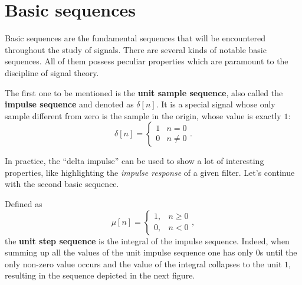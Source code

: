 \documentclass[\documentfontsize, twocolumn]{\classname}
\begin{document}
\section{Basic se\-quen\-ces}
Basic se\-quen\-ces are the fundamental se\-quen\-ces that will be encountered throughout the study of signals.
There are several kinds of notable basic se\-quen\-ces. All of them possess peculiar properties which are paramount to the discipline of signal theory.

The first one to be mentioned is the \textbf{unit sample se\-quen\-ce}, also called the \textbf{impulse se\-quen\-ce} and denoted as $\delta[n]$. It is a special signal whose only sample different from zero is the sample in the origin, whose value is exactly $1$: \[\delta[n] = \left\{\begin{array}{ll} 1 & n = 0\\ 0 & n \neq 0 \end{array}\right..\]

\begin{center}
\end{center}

In practice, the ``delta impulse'' can be used to show a lot of interesting properties, like highlighting the \emph{impulse response} of a given filter. 
Let's continue with the second basic se\-quen\-ce.

Defined as \[\mu[n] = \left\{\begin{array}{ll}1, & n \geq 0 \\ 0, & n < 0\end{array}\right.,\] the \textbf{unit step se\-quen\-ce} is the integral of the impulse se\-quen\-ce. Indeed, when summing up all the values of the unit impulse se\-quen\-ce one has only $0$s until the only non-zero value occurs and the value of the integral collapses to the unit $1$, resulting in the sequence depicted in the next figure.
\end{document}
